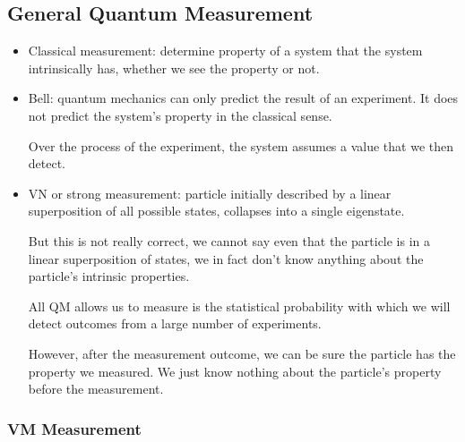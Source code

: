\documentclass[11pt, a4paper]{article}
\begin{document}
\subsection{General Quantum Measurement}
\begin{itemize}
    \item Classical measurement: determine property of a system that the system intrinsically has, whether we see the property or not.

    \item Bell: quantum mechanics can only predict the result of an experiment. It does not predict the system's property in the classical sense. 

    Over the process of the experiment, the system assumes a value that we then detect.

    \item VN or strong measurement: particle initially described by a linear superposition of all possible states, collapses into a single eigenstate. 

    But this is not really correct, we cannot say even that the particle is in a linear superposition of states, we in fact don't know anything about the particle's intrinsic properties. 

    All QM allows us to measure is the statistical probability with which we will detect outcomes from a large number of experiments. 

    However, after the measurement outcome, we can be sure the particle has the property we measured. We just know nothing about the particle's property before the measurement.

\end{itemize}

\subsubsection{VM Measurement}
\end{document}
